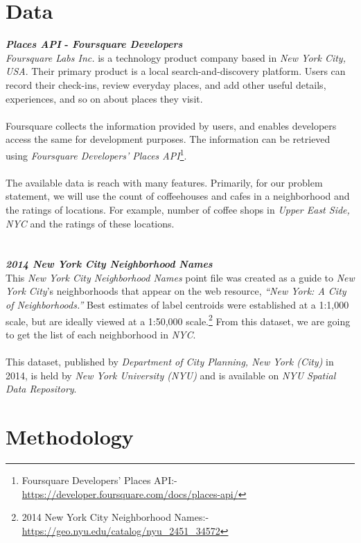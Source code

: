 \documentclass{article}
\begin{document}
\section{Data}
\textbf{\textit{Places API} - \textit{Foursquare Developers}}\\{\textit{Foursquare Labs Inc.} is a technology product company based in \textit{New York City, USA}. Their primary product is a local search-and-discovery platform. Users can record their check-ins, review everyday places, and add other useful details, experiences, and so on about places they visit.}\\\\{Foursquare collects the information provided by users, and enables developers access the same for development purposes. The information can be retrieved using \textit{Foursquare Developers' Places API}\footnote{Foursquare Developers' Places API:- \url{https://developer.foursquare.com/docs/places-api/}}.}\\\\{The available data is reach with many features. Primarily, for our problem statement, we will use the count of coffeehouses and cafes in a neighborhood and the ratings of locations. For example, number of coffee shops in \textit{Upper East Side, NYC} and the ratings of these locations.}\\\\\\
\textbf{\textit{2014 New York City Neighborhood Names}}\\
{This \textit{New York City Neighborhood Names} point file was created as a guide to \textit{New York City}’s neighborhoods that appear on the web resource, \textit{“New York: A City of Neighborhoods.”} Best estimates of label centroids were established at a 1:1,000 scale, but are ideally viewed at a 1:50,000 scale.\footnote{2014 New York City Neighborhood Names:- \url{https://geo.nyu.edu/catalog/nyu\_2451\_34572}} From this dataset, we are going to get the list of each neighborhood in \textit{NYC}.}\\\\
{This dataset, published by \textit{Department of City Planning, New York (City)} in 2014, is held by \textit{New York University (NYU)} and is available on \textit{NYU Spatial Data Repository}.}
\section{Methodology}
\end{document}
